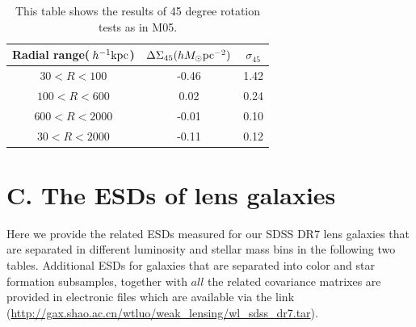 \documentclass[apj]{emulateapj}
\newcommand{\kpch}{\>h^{-1}{\rm {kpc}}}
\begin{document}
\begin{table}[h!]
\begin{center}
\caption{\label{tab:tbl-3} This table shows the results
   of 45 degree rotation tests as in M05. }
\begin{tabular}{ccc}
\hline
Radial range($\kpch$) & $\Delta\Sigma_{45}(hM_{\odot}{\rm pc}^{-2})$ & $\sigma_{45}$\\
\hline
$30<R<100$   & -0.46  & 1.42    \\
$100<R<600$  & 0.02   & 0.24    \\
$600<R<2000$ & -0.01  & 0.10    \\
$30<R<2000$  & -0.11  & 0.12    \\
\hline
\end{tabular}
\end{center}
\end{table}

\section{C. The ESDs of lens galaxies}

Here we provide the related ESDs measured for our SDSS DR7 lens
galaxies that are separated in different luminosity and stellar mass
bins in the following two tables. Additional ESDs for galaxies that
are separated into color and star formation subsamples, together with
$all$ the related covariance matrixes are provided in electronic files
which are available via the link
(\href{url}{http://gax.shao.ac.cn/wtluo/weak\_lensing/wl\_sdss\_dr7.tar}).
\end{document}
